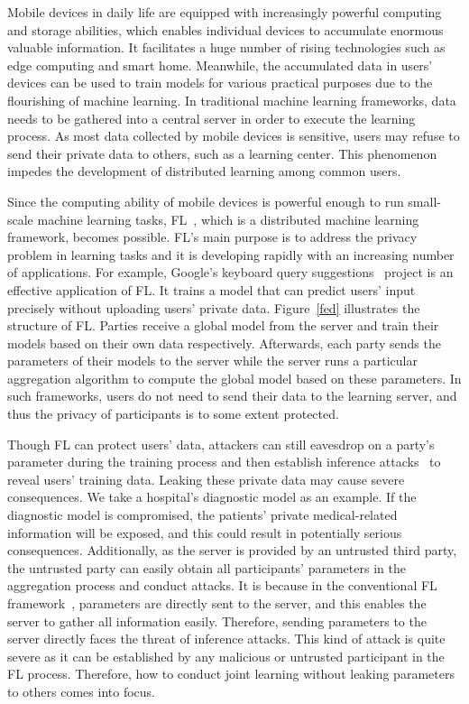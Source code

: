 Mobile devices in daily life are equipped with increasingly powerful computing and storage abilities, which enables individual devices to accumulate enormous valuable information. It facilitates a huge number of rising technologies such as edge computing and smart home. Meanwhile, the accumulated data in users' devices can be used to train models for various practical purposes due to the flourishing of machine learning. In traditional machine learning frameworks, data needs to be gathered into a central server in order to execute the learning process. As most data collected by mobile devices is sensitive, users may refuse to send their private data to others, such as a learning center. This phenomenon impedes the development of distributed learning among common users.

Since the computing ability of mobile devices is powerful enough to run small-scale machine learning tasks, FL~\cite{mcmahan2016communicationefficient}, which is a distributed machine learning framework, becomes possible. FL's main purpose is to address the privacy problem in learning tasks and it is developing rapidly with an increasing number of applications. For example, Google's keyboard query suggestions~\cite{yang2018applied} project is an effective application of FL. It trains a model that can predict users' input precisely without uploading users' private data. Figure~\ref{fed} illustrates the structure of FL. Parties receive a global model from the server and train their models based on their own data respectively. Afterwards, each party sends the parameters of their models to the server while the server runs a particular aggregation algorithm to compute the global model based on these parameters. In such frameworks, users do not need to send their data to the learning server, and thus the privacy of participants is to some extent protected.

Though FL can protect users' data, attackers can still eavesdrop on a party's parameter during the training process and then establish inference attacks~\cite{Beyond, Leakage, Nasr19} to reveal users' training data. Leaking these private data may cause severe consequences. We take a hospital's diagnostic model as an example. If the diagnostic model is compromised, the patients' private medical-related information will be exposed, and this could result in potentially serious consequences. Additionally, as the server is provided by an untrusted third party, the untrusted party can easily obtain all participants' parameters in the aggregation process and conduct attacks. It is because in the conventional FL framework~\cite{Nasr19}, parameters are directly sent to the server, and this enables the server to gather all information easily. Therefore, sending parameters to the server directly faces the threat of inference attacks. This kind of attack is quite severe as it can be established by any malicious or untrusted participant in the FL process. Therefore, how to conduct joint learning without leaking parameters to others comes into focus.

